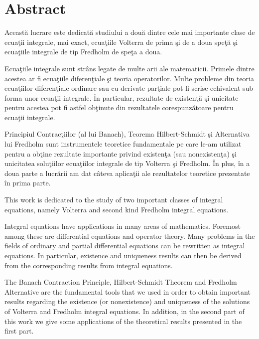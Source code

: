 \documentclass[a4paper,12pt,oneside]{report}
\begin{document}
\maketitle

\tableofcontents

\newpage
{}

\chapter*{Abstract}

Aceast\u{a} lucrare este dedicat\u{a} studiului a dou\u{a} dintre cele mai importante clase de ecua\c{t}ii integrale, mai exact, ecua\c{t}iile Volterra de prima \c{s}i de a doua spe\c{t}\u{a} \c{s}i ecua\c{t}iile integrale de tip Fredholm de spe\c{t}a a doua. 

Ecua\c{t}iile integrale sunt str\^{a}ns legate de multe arii ale matematicii. Primele dintre acestea ar fi ecua\c{t}iile diferen\c{t}iale \c{s}i teoria operatorilor. Multe probleme din teoria ecua\c{t}iilor diferen\c{t}iale ordinare sau cu derivate par\c{t}iale pot fi scrise echivalent sub forma unor ecua\c{t}ii integrale. \^{I}n particular, rezultate de existen\c{t}\u{a} \c{s}i unicitate pentru acestea pot fi astfel ob\c{t}inute din rezultatele corespunz\u{a}toare pentru ecua\c{t}ii integrale. 

Principiul Contrac\c{t}iilor (al lui Banach), Teorema Hilbert-Schmidt \c{s}i Alternativa lui Fredholm sunt instrumentele teoretice fundamentale pe care le-am utilizat pentru a ob\c{t}ine rezultate importante privind existen\c{t}a (sau nonexisten\c{t}a) \c{s}i unicitatea solu\c{t}iilor ecua\c{t}iilor integrale de tip Volterra \c{s}i Fredholm. \^{I}n plus, \^{i}n a doua parte a lucr\u{a}rii am dat c\^{a}teva aplica\c{t}ii ale rezultatelor teoretice
prezentate \^{i}n prima parte.

This work is dedicated to the study of two important classes of integral equations, namely Volterra and second kind Fredholm integral equations.

Integral equations have applications in many areas
of mathematics. Foremost among these are  differential equations and operator
theory. Many problems in the fields of ordinary and partial differential
equations can be rewritten as integral equations. In particular, existence and uniqueness
results can then be derived from the corresponding results from integral
equations. 

The Banach Contraction Principle, Hilbert-Schmidt Theorem and Fredholm Alternative are the fundamental tools that we used in order to obtain important results regarding the existence (or nonexistence) and uniqueness of the solutions of Volterra and Fredholm integral equations. In addition, in the second part of this work we give some applications of the theoretical results presented in the first part.
\end{document}
